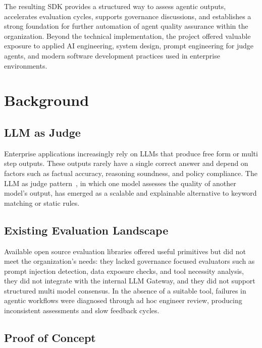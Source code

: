 \documentclass[12pt, a4paper, oneside]{report}
\begin{document}
The resulting SDK provides a structured way to assess agentic outputs, accelerates evaluation cycles, supports governance discussions, and establishes a strong foundation for further automation of agent quality assurance within the organization. Beyond the technical implementation, the project offered valuable exposure to applied AI engineering, system design, prompt engineering for judge agents, and modern software development practices used in enterprise environments.

\chapter{Background}

\section{LLM as Judge}

Enterprise applications increasingly rely on LLMs that produce free form or multi step outputs. These outputs rarely have a single correct answer and depend on factors such as factual accuracy, reasoning soundness, and policy compliance. The LLM as judge pattern~\cite{zheng2023judging, liu2023geval}, in which one model assesses the quality of another model's output, has emerged as a scalable and explainable alternative to keyword matching or static rules.

\section{Existing Evaluation Landscape}

Available open source evaluation libraries offered useful primitives but did not meet the organization's needs: they lacked governance focused evaluators such as prompt injection detection, data exposure checks, and tool necessity analysis, they did not integrate with the internal LLM Gateway, and they did not support structured multi model consensus. In the absence of a suitable tool, failures in agentic workflows were diagnosed through ad hoc engineer review, producing inconsistent assessments and slow feedback cycles.

\section{Proof of Concept}
\end{document}
